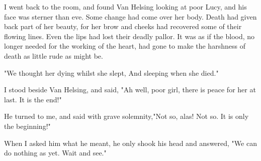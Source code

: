 I went back to the room, and found Van Helsing looking at poor Lucy, and his face was sterner than eve. Some change had come over her body. Death had given back part of her beauty, for her brow and cheeks had recovered some of their flowing lines. Even the lips had lost their deadly pallor. It was as if the blood, no longer needed for the working of the heart, had gone to make the harshness of death as little rude as might be. 

"We thought her dying whilst she slept, And sleeping when she died." 

I stood beside Van Helsing, and said, "Ah well, poor girl, there is peace for her at last. It is the end!" 

He turned to me, and said with grave solemnity,"Not so, alas! Not so. It is only the beginning!" 

When I asked him what he meant, he only shook his head and answered, "We can do nothing as yet. Wait and see." 

